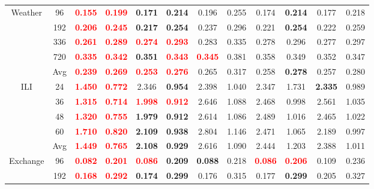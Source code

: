 \begin{table}[!htbp]
\begin{tabular}{c|c|cc|cc|cc|cc|cc}
\midrule
\multirow{5}{*}{Weather}
& 96 & \textbf{\textcolor{red}{0.155}} & \textbf{\textcolor{red}{0.199}} & \textbf{0.171} & \textbf{0.214} & 0.196 & 0.255 & 0.174 & \textbf{0.214} & 0.177 & 0.218 \\
& 192 & \textbf{\textcolor{red}{0.206}} & \textbf{\textcolor{red}{0.245}} & \textbf{0.217} & \textbf{0.254} & 0.237 & 0.296 & 0.221 & \textbf{0.254} & 0.222 & 0.259 \\
& 336 & \textbf{\textcolor{red}{0.261}} & \textbf{\textcolor{red}{0.289}} & \textbf{\textcolor{red}{0.274}} & \textbf{\textcolor{red}{0.293}} & 0.283 & 0.335 & 0.278 & 0.296 & 0.277 & 0.297 \\
& 720 & \textbf{\textcolor{red}{0.335}} & \textbf{\textcolor{red}{0.342}} & \textbf{0.351} & \textbf{\textcolor{red}{0.343}} & \textbf{\textcolor{red}{0.345}} & 0.381 & 0.358 & 0.349 & 0.352 & 0.347 \\
& Avg & \textbf{\textcolor{red}{0.239}} & \textbf{\textcolor{red}{0.269}} & \textbf{\textcolor{red}{0.253}} & \textbf{\textcolor{red}{0.276}} & 0.265 & 0.317 & 0.258 & \textbf{0.278} & 0.257 & 0.280 \\
\midrule
\multirow{5}{*}{ILI}
& 24 & \textbf{\textcolor{red}{1.450}} & \textbf{\textcolor{red}{0.772}} & 2.346 & \textbf{0.954} & 2.398 & 1.040 & 2.347 & 1.731 & \textbf{2.335} & 0.989 \\
& 36 & \textbf{\textcolor{red}{1.315}} & \textbf{\textcolor{red}{0.714}} & \textbf{\textcolor{red}{1.998}} & \textbf{\textcolor{red}{0.912}} & 2.646 & 1.088 & 2.468 & 0.998 & 2.561 & 1.035 \\
& 48 & \textbf{\textcolor{red}{1.320}} & \textbf{\textcolor{red}{0.755}} & \textbf{1.979} & \textbf{0.912} & 2.614 & 1.086 & 2.489 & 1.016 & 2.465 & 1.022 \\
& 60 & \textbf{\textcolor{red}{1.710}} & \textbf{\textcolor{red}{0.820}} & \textbf{2.109} & \textbf{0.938} & 2.804 & 1.146 & 2.471 & 1.065 & 2.189 & 0.997 \\
& Avg & \textbf{\textcolor{red}{1.449}} & \textbf{\textcolor{red}{0.765}} & \textbf{2.108} & \textbf{0.929} & 2.616 & 1.090 & 2.444 & 1.203 & 2.388 & 1.011 \\
\midrule
\multirow{5}{*}{Exchange}
& 96 & \textbf{\textcolor{red}{0.082}} & \textbf{\textcolor{red}{0.201}} & \textbf{\textcolor{red}{0.086}} & \textbf{0.209} & \textbf{0.088} & 0.218 & \textbf{\textcolor{red}{0.086}} & \textbf{\textcolor{red}{0.206}} & 0.109 & 0.236 \\
& 192 & \textbf{\textcolor{red}{0.168}} & \textbf{\textcolor{red}{0.292}} & \textbf{0.174} & \textbf{0.299} & 0.176 & 0.315 & 0.177 & \textbf{0.299} & 0.205 & 0.327 \\

\end{tabular}
\end{table}
